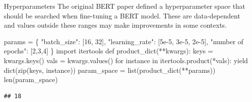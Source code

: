 \documentclass[
  10pt,
  ignorenonframetext,
  aspectratio=169]{beamer}
\newenvironment{Shaded}{\begin{snugshade}}{\end{snugshade}}
\newcommand{\BuiltInTok}[1]{\textcolor[rgb]{0.80,0.80,0.80}{#1}}
\newcommand{\ControlFlowTok}[1]{\textcolor[rgb]{0.94,0.87,0.69}{#1}}
\newcommand{\DecValTok}[1]{\textcolor[rgb]{0.86,0.86,0.80}{#1}}
\newcommand{\FloatTok}[1]{\textcolor[rgb]{0.75,0.75,0.82}{#1}}
\newcommand{\ImportTok}[1]{\textcolor[rgb]{0.80,0.80,0.80}{#1}}
\newcommand{\KeywordTok}[1]{\textcolor[rgb]{0.94,0.87,0.69}{#1}}
\newcommand{\NormalTok}[1]{\textcolor[rgb]{0.80,0.80,0.80}{#1}}
\newcommand{\OperatorTok}[1]{\textcolor[rgb]{0.94,0.94,0.82}{#1}}
\newcommand{\StringTok}[1]{\textcolor[rgb]{0.80,0.58,0.58}{#1}}
\begin{document}
\begin{frame}[fragile]{Hyperparameters}
\protect\hypertarget{hyperparameters}{}
The original BERT paper defined a hyperparameter space that should be
searched when fine-tuning a BERT model. These are data-dependent and
values outside these ranges may make improvements in some contexts.

\medskip
\scriptsize

\begin{Shaded}
\begin{Highlighting}[]
\NormalTok{params }\OperatorTok{=}\NormalTok{ \{}
  \StringTok{"batch\_size"}\NormalTok{: [}\DecValTok{16}\NormalTok{, }\DecValTok{32}\NormalTok{],}
  \StringTok{"learning\_rate"}\NormalTok{: [}\FloatTok{5e{-}5}\NormalTok{, }\FloatTok{3e{-}5}\NormalTok{, }\FloatTok{2e{-}5}\NormalTok{],}
  \StringTok{"number of epochs"}\NormalTok{: [}\DecValTok{2}\NormalTok{,}\DecValTok{3}\NormalTok{,}\DecValTok{4}\NormalTok{]}
\NormalTok{\}}
\ImportTok{import}\NormalTok{ itertools}
\KeywordTok{def}\NormalTok{ product\_dict(}\OperatorTok{**}\NormalTok{kwargs):}
\NormalTok{    keys }\OperatorTok{=}\NormalTok{ kwargs.keys()}
\NormalTok{    vals }\OperatorTok{=}\NormalTok{ kwargs.values()}
    \ControlFlowTok{for}\NormalTok{ instance }\KeywordTok{in}\NormalTok{ itertools.product(}\OperatorTok{*}\NormalTok{vals):}
        \ControlFlowTok{yield} \BuiltInTok{dict}\NormalTok{(}\BuiltInTok{zip}\NormalTok{(keys, instance))}
\NormalTok{param\_space }\OperatorTok{=} \BuiltInTok{list}\NormalTok{(product\_dict(}\OperatorTok{**}\NormalTok{params))}
\BuiltInTok{len}\NormalTok{(param\_space)}
\end{Highlighting}
\end{Shaded}

\begin{verbatim}
## 18
\end{verbatim}
\end{frame}
\end{document}

